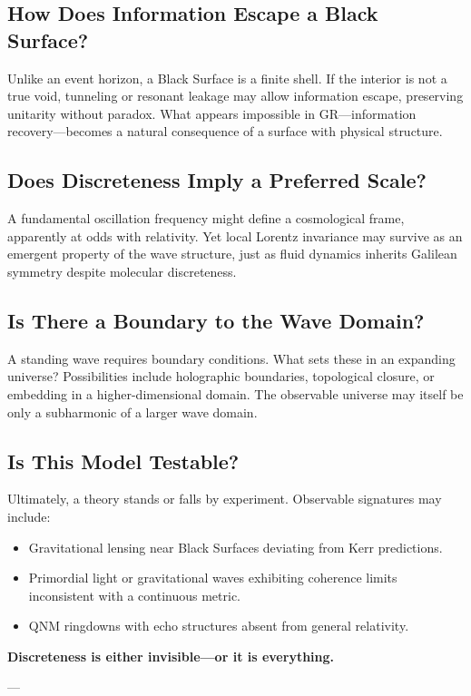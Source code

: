 \documentclass[12pt]{article}
\begin{document}
\subsection{How Does Information Escape a Black Surface?}

Unlike an event horizon, a Black Surface is a finite shell. If the interior is not a true void, tunneling or resonant leakage may allow information escape, preserving unitarity without paradox. What appears impossible in GR---information recovery---becomes a natural consequence of a surface with physical structure.

\subsection{Does Discreteness Imply a Preferred Scale?}

A fundamental oscillation frequency might define a cosmological frame, apparently at odds with relativity. Yet local Lorentz invariance may survive as an emergent property of the wave structure, just as fluid dynamics inherits Galilean symmetry despite molecular discreteness.

\subsection{Is There a Boundary to the Wave Domain?}

A standing wave requires boundary conditions. What sets these in an expanding universe? Possibilities include holographic boundaries, topological closure, or embedding in a higher-dimensional domain. The observable universe may itself be only a subharmonic of a larger wave domain.

\subsection{Is This Model Testable?}

Ultimately, a theory stands or falls by experiment. Observable signatures may include:

\begin{itemize}
    \item Gravitational lensing near Black Surfaces deviating from Kerr predictions.
    \item Primordial light or gravitational waves exhibiting coherence limits inconsistent with a continuous metric.
    \item QNM ringdowns with echo structures absent from general relativity.
\end{itemize}

\vspace{2em}

\begin{center}
\textbf{Discreteness is either invisible---or it is everything.}
\end{center}


---


\newpage

\end{document}
